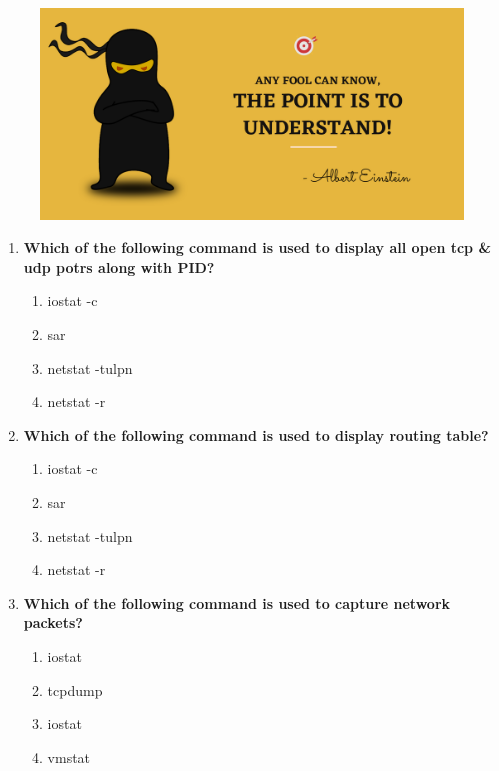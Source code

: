 \setlength{\columnsep}{3pt}
\begin{flushleft}
	
	\paragraph{}
	\bigskip
	
	\begin{figure}[h!]
		\centering
		\includegraphics[scale=.2]{content/practise.jpg}
	\end{figure}	
	\begin{enumerate}
		
		\item \textbf{Which of the following command is used to display all open tcp \& udp potrs along with PID?}
		\begin{enumerate}[label=(\alph*)]
			\item iostat -c 
			\item sar  
			\item netstat -tulpn   %
			\item netstat -r
		\end{enumerate}
		\bigskip
		\bigskip	
		

		\item \textbf{Which of the following command is used to display routing table?}
		\begin{enumerate}[label=(\alph*)]
			\item iostat -c 
			\item sar  
			\item netstat -tulpn   
			\item netstat -r    %
		\end{enumerate}
		\bigskip
		\bigskip	
		
		\item \textbf{Which of the following command is used to capture network packets?}
		\begin{enumerate}[label=(\alph*)]
			\item iostat
			\item tcpdump  %
			\item iostat
			\item vmstat
		\end{enumerate}
		\bigskip
		\bigskip	
		

\end{enumerate}
\end{flushleft}
